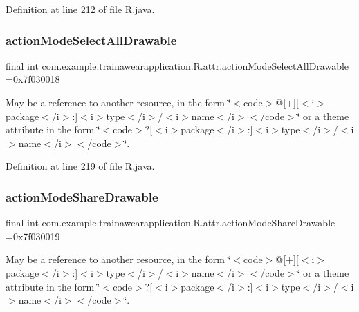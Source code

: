 Definition at line 212 of file R.\+java.

\mbox{\label{classcom_1_1example_1_1trainawearapplication_1_1_r_1_1attr_a13811bc616b01f241e21291564236e9b}} 
\subsubsection{\texorpdfstring{actionModeSelectAllDrawable}{actionModeSelectAllDrawable}}
{\footnotesize\ttfamily final int com.\+example.\+trainawearapplication.\+R.\+attr.\+action\+Mode\+Select\+All\+Drawable =0x7f030018\hspace{0.3cm}{\ttfamily [static]}}

May be a reference to another resource, in the form \char`\"{}$<$code$>$@\mbox{[}+\mbox{]}\mbox{[}$<$i$>$package$<$/i$>$\+:\mbox{]}$<$i$>$type$<$/i$>$/$<$i$>$name$<$/i$>$$<$/code$>$\char`\"{} or a theme attribute in the form \char`\"{}$<$code$>$?\mbox{[}$<$i$>$package$<$/i$>$\+:\mbox{]}$<$i$>$type$<$/i$>$/$<$i$>$name$<$/i$>$$<$/code$>$\char`\"{}. 

Definition at line 219 of file R.\+java.

\mbox{\label{classcom_1_1example_1_1trainawearapplication_1_1_r_1_1attr_aa1ead34c5ee8d32f462768b4be08a26b}} 
\subsubsection{\texorpdfstring{actionModeShareDrawable}{actionModeShareDrawable}}
{\footnotesize\ttfamily final int com.\+example.\+trainawearapplication.\+R.\+attr.\+action\+Mode\+Share\+Drawable =0x7f030019\hspace{0.3cm}{\ttfamily [static]}}

May be a reference to another resource, in the form \char`\"{}$<$code$>$@\mbox{[}+\mbox{]}\mbox{[}$<$i$>$package$<$/i$>$\+:\mbox{]}$<$i$>$type$<$/i$>$/$<$i$>$name$<$/i$>$$<$/code$>$\char`\"{} or a theme attribute in the form \char`\"{}$<$code$>$?\mbox{[}$<$i$>$package$<$/i$>$\+:\mbox{]}$<$i$>$type$<$/i$>$/$<$i$>$name$<$/i$>$$<$/code$>$\char`\"{}. 

